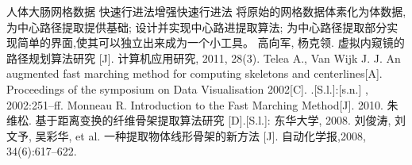 \assignReq
{人体大肠网格数据}
{快速行进法增强快速行进法}
{}
{}
{}
\assignWork
{将原始的网格数据体素化为体数据,为中心路径提取提供基础;}
{设计并实现中心路进提取算法;}
{为中心路径提取部分实现简单的界面,使其可以独立出来成为一个小工具。}
{}
{}
{}
\assignRef
{高向军, 杨克领. 虚拟内窥镜的路径规划算法研究 [J]. 计算机应用研究, 2011, 28(3).}
{Telea A., Van Wijk J. J. An augmented fast marching method for computing }
{skeletons and centerlines[A]. Proceedings of the symposium on Data }
{Visualisation 2002[C]. .[S.l.]:[s.n.] , 2002:251–ff.}
{Monneau R. Introduction to the Fast Marching Method[J]. 2010.}
{朱维松. 基于距离变换的纤维骨架提取算法研究 [D].[S.l.]: 东华大学, 2008.}
{刘俊涛, 刘文予, 吴彩华, et al. 一种提取物体线形骨架的新方法 [J].}
{自动化学报,2008, 34(6):617–622.}
